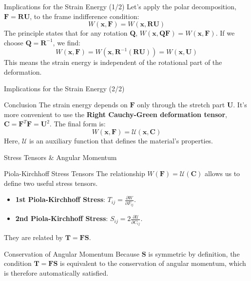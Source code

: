 \documentclass{beamer}
\begin{document}
\begin{frame}{Implications for the Strain Energy (1/2)}
    Let's apply the polar decomposition, $\mathbf{F} = \mathbf{R}\mathbf{U}$, to the frame indifference condition:
    $$ W(\mathbf{x}, \mathbf{F}) = W(\mathbf{x}, \mathbf{R}\mathbf{U}) $$
    \pause
    The principle states that for any rotation $\mathbf{Q}$, $W(\mathbf{x}, \mathbf{Q}\mathbf{F}) = W(\mathbf{x}, \mathbf{F})$. If we choose $\mathbf{Q}=\mathbf{R}^{-1}$, we find:
    $$ W(\mathbf{x}, \mathbf{F}) = W(\mathbf{x}, \mathbf{R}^{-1}(\mathbf{R}\mathbf{U})) = W(\mathbf{x}, \mathbf{U}) $$
    \pause
    This means the strain energy is independent of the rotational part of the deformation.
\end{frame}

\begin{frame}{Implications for the Strain Energy (2/2)}
    \begin{alertblock}{Conclusion}
        The strain energy depends on $\mathbf{F}$ only through the stretch part $\mathbf{U}$.
        \pause
        It's more convenient to use the \textbf{Right Cauchy-Green deformation tensor}, $\mathbf{C} = \mathbf{F}^T\mathbf{F} = \mathbf{U}^2$. The final form is:
        $$ W(\mathbf{x}, \mathbf{F}) = \mathcal{U}(\mathbf{x}, \mathbf{C}) $$
        Here, $\mathcal{U}$ is an auxiliary function that defines the material's properties.
    \end{alertblock}
\end{frame}

\begin{frame}{Stress Tensors \& Angular Momentum}
    \begin{block}{Piola-Kirchhoff Stress Tensors}
        The relationship $W(\mathbf{F}) = \mathcal{U}(\mathbf{C})$ allows us to define two useful stress tensors.
        \begin{itemize}
            \item \textbf{1st Piola-Kirchhoff Stress}: $T_{ij} = \frac{\partial W}{\partial F_{ij}}$.
            \item \textbf{2nd Piola-Kirchhoff Stress}: $S_{ij} = 2\frac{\partial \mathcal{U}}{\partial C_{ij}}$.
        \end{itemize}
        They are related by $\mathbf{T} = \mathbf{F}\mathbf{S}$.
    \end{block}
    \pause
    \begin{alertblock}{Conservation of Angular Momentum}
        Because $\mathbf{S}$ is symmetric by definition, the condition $\mathbf{T} = \mathbf{F}\mathbf{S}$ is equivalent to the conservation of angular momentum, which is therefore automatically satisfied.
    \end{alertblock}
\end{frame}
\end{document}
